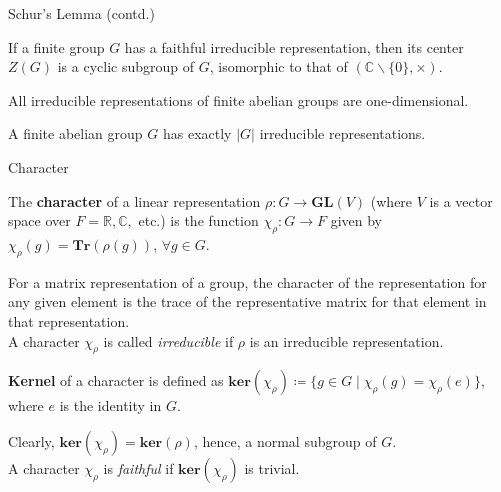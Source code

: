 \documentclass{beamer}
\newcommand\boldtext[1]{\textcolor{bolds}{\textbf{#1}}}
\newcommand\italictext[1]{\textcolor{italics}{\textit{#1}}}
\begin{document}
\begin{frame}{Schur's Lemma (contd.)}
    \begin{corollary}
        If a finite group $G$ has a faithful irreducible representation, then its center $Z(G)$ is a cyclic subgroup of $G$, isomorphic to that of $(\mathbb{C}\backslash \{0\},\times)$.
    \end{corollary}
    \begin{corollary}
        All irreducible representations of finite abelian groups are one-dimensional.
    \end{corollary}
    \begin{corollary}
        A finite abelian group $G$ has exactly $\lvert G\rvert$ irreducible representations.
    \end{corollary}
\end{frame}

\begin{frame}{Character}
    \begin{definition}
        The \boldtext{character} of a linear representation $\rho:G\xrightarrow{}\mathbf{GL}(V)$ (where $V$ is a vector space over $F=\mathbb{R}, \mathbb{C},$ etc.) is the function $\chi_\rho:G\xrightarrow{}F$ given by $\chi_\rho(g)=\mathbf{Tr}(\rho(g))$, $\forall g\in G$.
    \end{definition}
    For a matrix representation of a group, the character of the representation for any given element is the trace of the representative matrix for that element in that representation.\\
    A character $\chi_\rho$ is called \italictext{irreducible} if $\rho$ is an irreducible representation.\\
    \begin{definition}
        \boldtext{Kernel} of a character is defined as $\mathbf{ker}(\chi_\rho)\coloneqq\{g\in G\mid \chi_\rho(g)=\chi_\rho(e)\}$, where $e$ is the identity in $G$.
    \end{definition}
    Clearly, $\mathbf{ker}(\chi_\rho)=\mathbf{ker}(\rho)$, hence, a normal subgroup of $G$.\\
    A character $\chi_\rho$ is \italictext{faithful} if $\mathbf{ker}(\chi_\rho)$ is trivial.
\end{frame}
\end{document}
